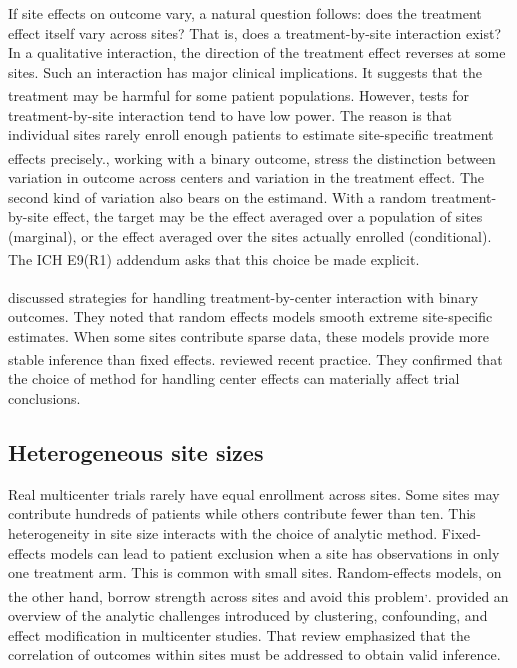 \documentclass[
  11pt,
]{article}
\begin{document}
If site effects on outcome vary, a natural question follows:
does the treatment effect itself vary across sites? That is, does
a treatment-by-site interaction exist? In a qualitative
interaction, the direction of the treatment effect reverses at
some sites. Such an interaction has major clinical implications.
It suggests that the treatment may be harmful for some patient
populations\textsuperscript{}. However, tests for
treatment-by-site interaction tend to have low power. The reason
is that individual sites rarely enroll enough patients to estimate
site-specific treatment effects precisely.\textsuperscript{}, working with a binary outcome,
stress the distinction between variation in outcome across centers
and variation in the treatment effect. The second kind of variation
also bears on the estimand. With a random treatment-by-site effect,
the target may be the effect averaged over a population of sites
(marginal), or the effect averaged over the sites actually enrolled
(conditional). The ICH E9(R1) addendum asks that this choice be made
explicit\textsuperscript{}.

\textsuperscript{} discussed strategies for handling
treatment-by-center interaction with binary outcomes. They noted
that random effects models smooth extreme site-specific
estimates. When some sites contribute sparse data, these models
provide more stable inference than fixed effects.\textsuperscript{} reviewed recent practice. They confirmed
that the choice of method for handling center effects can
materially affect trial conclusions.

\subsection{Heterogeneous site sizes}\label{heterogeneous-site-sizes}

Real multicenter trials rarely have equal enrollment across
sites. Some sites may contribute hundreds of patients while
others contribute fewer than ten. This heterogeneity in site
size interacts with the choice of analytic method.
Fixed-effects models can lead to patient exclusion when a site
has observations in only one treatment arm. This is common with
small sites. Random-effects models, on the other hand,
borrow strength across sites and avoid this problem\textsuperscript{,}.\textsuperscript{} provided an overview of the analytic
challenges introduced by clustering, confounding, and effect
modification in multicenter studies. That review emphasized that
the correlation of outcomes within sites must be addressed to
obtain valid inference.
\end{document}

